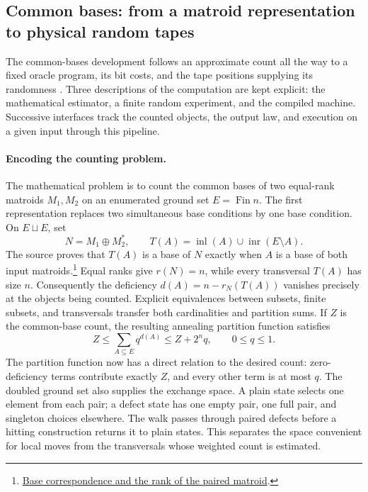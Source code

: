 \subsection{Common bases: from a matroid representation to physical random tapes}
\label{sec:common-bases}

The common-bases development follows an approximate count all the way to a
fixed oracle program, its bit costs, and the tape positions supplying its
randomness \citep{OAICommonBases}. Three descriptions of the computation
are kept explicit: the mathematical estimator, a finite random experiment,
and the compiled machine. Successive interfaces track the counted objects,
the output law, and execution on a given input through this pipeline.

\paragraph{Encoding the counting problem.}
The mathematical problem is to count the common bases of two equal-rank matroids $M_1,M_2$ on an enumerated ground set $E=\operatorname{Fin}n$. The first representation replaces two simultaneous base conditions by one base condition. On $E\sqcup E$, set
\[
 N=M_1\oplus M_2^*,\qquad
 T(A)=\operatorname{inl}(A)\cup\operatorname{inr}(E\setminus A).
\]
The source proves that $T(A)$ is a base of $N$ exactly when $A$ is a base of both input matroids.\footnote{\href{https://github.com/openai/math/blob/fd4aeeb2ee4fc729c18d98444fed42fd0529eeeb/lean/OAI/Combinatorics/MatroidCounting/CommonBases.lean\#L7156-L7167}{Base correspondence and the rank of the paired matroid}.} Equal ranks give $r(N)=n$, while every transversal $T(A)$ has size $n$. Consequently the deficiency $d(A)=n-r_N(T(A))$ vanishes precisely at the objects being counted. Explicit equivalences between subsets, finite subsets, and transversals transfer both cardinalities and partition sums. If $Z$ is the common-base count, the resulting annealing partition function satisfies
\[
 Z\leq \sum_{A\subseteq E}q^{d(A)}\leq Z+2^nq,
 \qquad 0\leq q\leq1.
\]
The partition function now has a direct relation to the desired count:
zero-deficiency terms contribute exactly $Z$, and every other term is at
most $q$. The doubled ground set also supplies the exchange space. A plain
state selects one element from each pair; a defect state has one empty
pair, one full pair, and singleton choices elsewhere. The walk passes
through paired defects before a hitting construction returns it to plain
states. This separates the space convenient for local moves from the
transversals whose weighted count is estimated.

